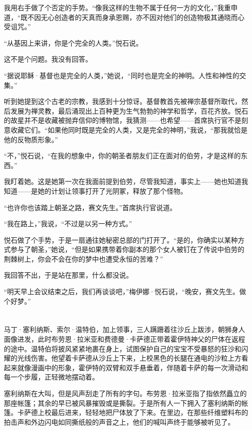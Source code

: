 \documentclass[AutoFakeBold=true]{book}
\begin{document}
我用右手做了个否定的手势。``像我这样的生物不属于任何一方的文化，''我重申道，``既不因无心创造者的天真而身承恩赐，亦不因对他们的创造物极其通晓而心受诅咒。''

``从基因上来讲，你是个完全的人类。''悦石说。

这不是个问题。我没有回答。

``据说耶稣·基督也是完全的人类，''她说，``同时也是完全的神明。人性和神性的交集。''

听到她提到这个古老的宗教，我感到十分惊讶。基督教首先被禅宗基督所取代，然后发展为禅灵教，最后涌现出上百种更为生气勃勃的神学和哲学，百花齐放。悦石的故星并不是收藏被抛弃信仰的博物馆，我猜测——也希望——首席执行官不是刻意收藏它们。``如果他同时既是完全的人类，又是完全的神明，''我说，``那我就恰是他的反物质形象。''

``不，''悦石说，``在我的想象中，你的朝圣者朋友们正在面对的伯劳，才是这样的东西。''

我盯着她。这是她第一次在我面前提到伯劳，尽管我知道，事实上——她也知道我知道——是她的计划让领事打开了光阴冢，释放了那个怪物。

``也许你也该踏上朝圣之路，赛文先生。''首席执行官说道。

``我在路上，''我说，``不过是以另一种方式。''

悦石做了个手势，于是一扇通往她秘密总部的门打开了。``是的，你确实以某种方式参与了朝圣，''她说，``但是如果携带着你副本的那个女人被钉在了传说中伯劳的荆棘树上，你会不会在你的梦中也遭受永恒的苦难？''

我回答不出，于是站在那里，什么都没说。

``明天早上会议结束之后，我们再谈谈吧，''梅伊娜·悦石说，``晚安，赛文先生。做个好梦。''

\chapter{}

马丁·塞利纳斯、索尔·温特伯，加上领事，三人蹒跚着往沙丘上跋涉，朝狮身人面像进发，此时布劳恩·拉米亚和费德曼·卡萨德正带着霍伊特神父的尸体在返程的途中。温特伯将披风紧紧地裹在身上，试图保护自己的宝宝不受暴怒的狂沙和闪耀的光线伤害。他望着卡萨德从沙丘上下来，上校黑色的长腿在通电的沙粒上方看起来就像漫画中的形象，霍伊特的双臂和双手悬垂着，伴随着卡萨的每一次滑动和每一个步履，正轻微地摆动着。

塞利纳斯在大叫，但是风声刮走了所有的字句。布劳恩·拉米亚指了指依然矗立的那座帐篷；其余的早已被风暴摧毁或是撕裂。于是所有人一下拥入了塞利纳斯的帐篷。卡萨德上校最后进来，轻轻地把尸体放了下来。在里边，在那些纤维塑料布的拍击声和外边闪电如同撕纸般的声音之上，他们的喊叫声终于能够被听见了。
\end{document}

